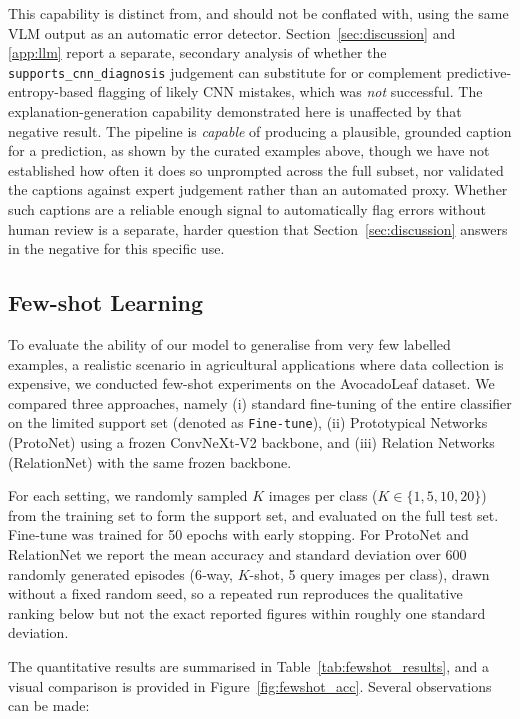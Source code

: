 This capability is distinct from, and should not be conflated with, using the same VLM output as an automatic error detector. Section~\ref{sec:discussion} and \ref{app:llm} report a separate, secondary analysis of whether the \texttt{supports\_cnn\_diagnosis} judgement can substitute for or complement predictive-entropy-based flagging of likely CNN mistakes, which was \emph{not} successful. The explanation-generation capability demonstrated here is unaffected by that negative result. The pipeline is \emph{capable} of producing a plausible, grounded caption for a prediction, as shown by the curated examples above, though we have not established how often it does so unprompted across the full subset, nor validated the captions against expert judgement rather than an automated proxy. Whether such captions are a reliable enough signal to automatically flag errors without human review is a separate, harder question that Section~\ref{sec:discussion} answers in the negative for this specific use.


\subsection{Few-shot Learning}
\label{subsec:fewshot}

To evaluate the ability of our model to generalise from very few labelled examples, a realistic scenario in agricultural applications where data collection is expensive, we conducted few-shot experiments on the AvocadoLeaf dataset. We compared three approaches, namely (i) standard fine-tuning of the entire classifier on the limited support set (denoted as \texttt{Fine‑tune}), (ii) Prototypical Networks (ProtoNet) using a frozen ConvNeXt‑V2 backbone, and (iii) Relation Networks (RelationNet) with the same frozen backbone.

For each setting, we randomly sampled \(K\) images per class (\(K \in \{1,5,10,20\}\)) from the training set to form the support set, and evaluated on the full test set. Fine‑tune was trained for 50 epochs with early stopping. For ProtoNet and RelationNet we report the mean accuracy and standard deviation over 600 randomly generated episodes (6‑way, \(K\)-shot, 5 query images per class), drawn without a fixed random seed, so a repeated run reproduces the qualitative ranking below but not the exact reported figures within roughly one standard deviation.

The quantitative results are summarised in Table~\ref{tab:fewshot_results}, and a visual comparison is provided in Figure~\ref{fig:fewshot_acc}. Several observations can be made:

